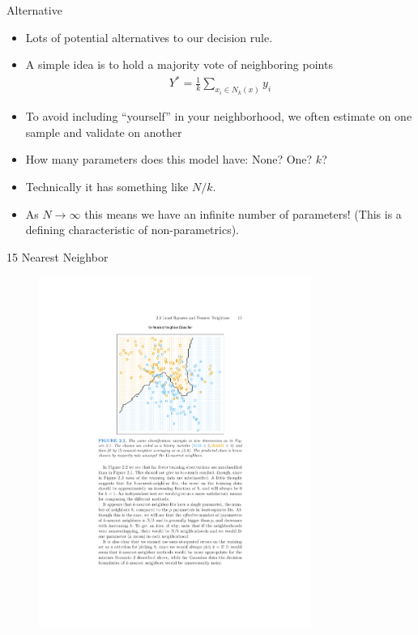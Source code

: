 \documentclass[11pt,handout,xcolor=pdftex,dvipsnames,table,mathserif,aspectratio=169]{beamer}
\begin{document}
\begin{frame}{Alternative}
\begin{itemize}
\item Lots of potential alternatives to our decision rule.
\item A simple idea is to hold a majority vote of neighboring points 
\begin{eqnarray*}
Y^{*} = \frac{1}{k} \sum_{x_i \in N_k(x)} y_i
\end{eqnarray*}
\item To avoid including ``yourself'' in your neighborhood, we often estimate on one sample and validate on another
\item How many parameters does this model have: None? One? $k$? 
\item Technically it has something like $N/k$.
\item As $N \rightarrow \infty$ this means we have an infinite number of parameters! (This is a defining characteristic of non-parametrics).
\end{itemize}
\end{frame}


\begin{frame}{15 Nearest Neighbor}
\begin{figure}[htbp]
\begin{center}
\includegraphics[width=3.5in]{./resources/classifier15nn.pdf}
\label{class15nn}
\end{center}
\end{figure}
\end{frame}
\end{document}
